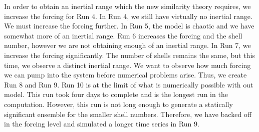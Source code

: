 In order to obtain an inertial range which the new similarity theory requires, we increase the forcing for Run 4.  In Run 4, we still have virtually no inertial range.  We must increase the forcing further.  In Run 5, the model is chaotic and we have somewhat more of an inertial range.  Run 6 increases the forcing and the shell number, however we are not obtaining enough of an inertial range. In Run 7, we increase the forcing significantly.  The number of shells remains the same, but this time, we observe a distinct inertial range.  We want to observe how much forcing we can pump into the system before numerical problems arise.  Thus, we create Run 8 and Run 9.  Run 10 is at the limit of what is numerically possible with out model.  This run took four days to complete and is the longest run in the computation.  However, this run is not long enough to generate a statically significant ensemble for the smaller shell numbers.  Therefore, we have backed off in the forcing level and simulated a longer time series in Run 9.

